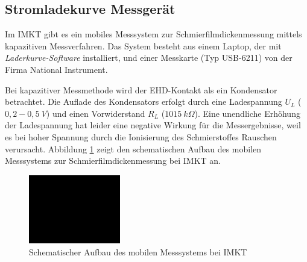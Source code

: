 \subsection{Stromladekurve Messgerät}
\label{sub:stromladekurve_messgeraet}

Im IMKT gibt es ein mobiles Messsystem zur Schmierfilmdickenmessung mittels kapazitiven Messverfahren.
Das System besteht aus einem Laptop, der mit \textit{Laderkurve-Software} installiert, und einer Messkarte (Typ USB-6211) von der Firma National Instrument.

Bei kapazitiver Messmethode wird der EHD-Kontakt als ein Kondensator betrachtet.
Die Auflade des Kondensators erfolgt durch eine Ladespannung $U_L$ ($0,2 - 0,5 \ V$) und einen Vorwiderstand $R_L$ ($1015 \ k\Omega$).
Eine unendliche Erhöhung der Ladespannung hat leider eine negative Wirkung für die Messergebnisse, weil es bei hoher Spannung durch die Ionisierung des Schmierstoffes Rauschen verursacht.
Abbildung \ref{fig:Schematischer_aufbau_des_mobilen_messsystems} zeigt den schematischen Aufbau des mobilen Messsystems zur Schmierfilmdickenmessung bei IMKT an.
\begin{figure}[htb]
    \centering
    \includegraphics[width=4cm]{./images/blank_img.jpg}
    \caption{Schematischer Aufbau des mobilen Messsystems bei IMKT}
    \label{fig:Schematischer_aufbau_des_mobilen_messsystems}
\end{figure}

